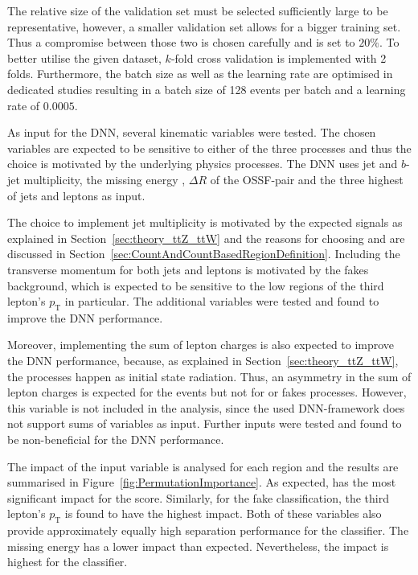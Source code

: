 \documentclass[bachelor,oneside, BCOR10mm,
			ngerman,english  %
]{GAUBM}
\begin{document}
The relative size of the validation set must be selected sufficiently large to be representative, however, a smaller validation set allows for a bigger training set. Thus a compromise between those two is chosen carefully and is set to $20\%$. To better utilise the given dataset, $k$-fold cross validation \cite{nn_kfolding} is implemented with 2 folds. Furthermore, the batch size \cite{nn_parameters} as well as the learning rate \cite{nn_nodecalculation} are optimised in dedicated studies resulting in a batch size of 128 events per batch and a learning rate of $0.0005$.

As input for the DNN, several kinematic variables were tested. The chosen variables are expected to be sensitive to either of the three processes and thus the choice is motivated by the underlying physics processes. The DNN uses jet and $b$-jet multiplicity, the missing energy \ETMiss, $\Delta R$ of the OSSF-pair and the three highest \pT of jets and leptons as input. 

The choice to implement jet multiplicity is motivated by the expected signals as explained in Section~\ref{sec:theory_ttZ_ttW} and the reasons for choosing \ETMiss and \dR are discussed in Section~\ref{sec:CountAndCountBasedRegionDefinition}. Including the transverse momentum \pT for both jets and leptons is motivated by the fakes background, which is expected to be sensitive to the low regions of the third lepton's $p_{\text{T}}$ in particular. The additional \pT variables were tested and found to improve the DNN performance. 

Moreover, implementing the sum of lepton charges is also expected to improve the DNN performance, because, as explained in Section~\ref{sec:theory_ttZ_ttW}, the \ttbarW processes happen as initial state radiation. Thus, an asymmetry in the sum of lepton charges is expected for the \ttbarW events but not for \ttbarZ or fakes processes. However, this variable is not included in the analysis, since the used DNN-framework does not support sums of variables as input. Further inputs were tested and found to be non-beneficial for the DNN performance.

The impact of the input variable is analysed for each region and the results are summarised in Figure~\ref{fig:PermutationImportance}. As expected, \dR has the most significant impact for the \ttbarZ score. Similarly, for the fake classification, the third lepton's $p_{\text{T}}$ is found to have the highest impact. Both of these variables also provide approximately equally high separation performance for the \ttbarW classifier. The missing energy has a lower impact than expected. Nevertheless, the \ETMiss impact is highest for the \ttbarW classifier.
\end{document}

